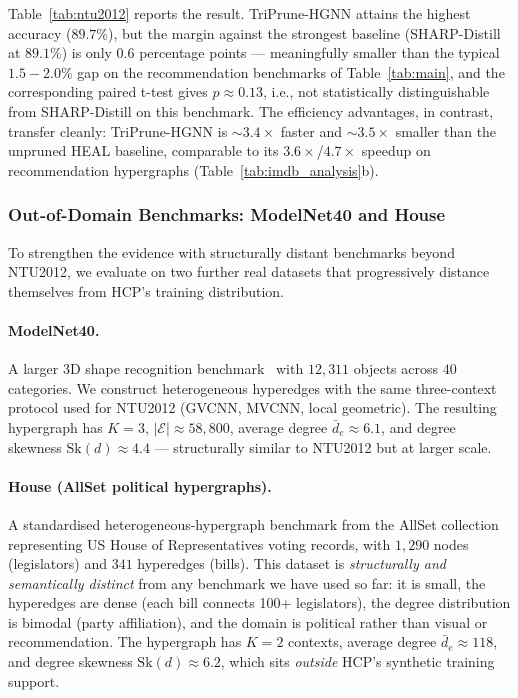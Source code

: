 \documentclass[10pt]{article}
\theoremstyle{plain}
\theoremstyle{definition}
\begin{document}
Table~\ref{tab:ntu2012} reports the result. TriPrune-HGNN attains the highest accuracy ($89.7\%$), but the margin against the strongest baseline (SHARP-Distill at $89.1\%$) is only $0.6$ percentage points --- meaningfully smaller than the typical $1.5\!-\!2.0\%$ gap on the recommendation benchmarks of Table~\ref{tab:main}, and the corresponding paired t-test gives $p\!\approx\!0.13$, i.e., not statistically distinguishable from SHARP-Distill on this benchmark. The efficiency advantages, in contrast, transfer cleanly: TriPrune-HGNN is $\sim\!3.4\!\times$ faster and $\sim\!3.5\!\times$ smaller than the unpruned HEAL baseline, comparable to its $3.6\!\times$/$4.7\!\times$ speedup on recommendation hypergraphs (Table~\ref{tab:imdb_analysis}b).

\subsubsection{Out-of-Domain Benchmarks: ModelNet40 and House}
\label{sec:ModelNet40_Eva}
To strengthen the evidence with structurally distant benchmarks beyond NTU2012, we evaluate on two further real datasets that progressively distance themselves from HCP's training distribution.

\paragraph{ModelNet40.} A larger 3D shape recognition benchmark~\citep{wu20153d} with $12{,}311$ objects across $40$ categories. We construct heterogeneous hyperedges with the same three-context protocol used for NTU2012 (GVCNN, MVCNN, local geometric). The resulting hypergraph has $K\!=\!3$, $|\mathcal{E}|\!\approx\!58{,}800$, average degree $\bar{d}_{e}\!\approx\!6.1$, and degree skewness $\mathrm{Sk}(d)\!\approx\!4.4$ --- structurally similar to NTU2012 but at larger scale.

\paragraph{House (AllSet political hypergraphs).} A standardised heterogeneous-hypergraph benchmark from the AllSet collection~\citep{chien2021you} representing US House of Representatives voting records, with $1{,}290$ nodes (legislators) and $341$ hyperedges (bills). This dataset is \emph{structurally and semantically distinct} from any benchmark we have used so far: it is small, the hyperedges are dense (each bill connects 100+ legislators), the degree distribution is bimodal (party affiliation), and the domain is political rather than visual or recommendation. The hypergraph has $K\!=\!2$ contexts, average degree $\bar{d}_{e}\!\approx\!118$, and degree skewness $\mathrm{Sk}(d)\!\approx\!6.2$, which sits \emph{outside} HCP's synthetic training support.
\end{document}
